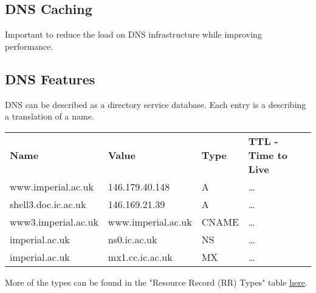 \documentclass{report}
\begin{document}
        \subsection*{DNS Caching}
            Important to reduce the load on DNS infrastructure while improving performance.
        \subsection*{DNS Features}
            DNS can be described as a directory service database. Each entry is a  describing a translation of a name.
            \begin{center}
                \begin{tabular}{l l l l}
                    \textbf{Name} & \textbf{Value} & \textbf{Type} & \textbf{TTL - Time to Live} \\
                    www.imperial.ac.uk & 146.179.40.148 & A & \dots \\
                    shell3.doc.ic.ac.uk & 146.169.21.39 & A & \dots \\
                    www3.imperial.ac.uk & www.imperial.ac.uk & CNAME & \dots \\
                    imperial.ac.uk & ns0.ic.ac.uk & NS & \dots \\
                    imperial.ac.uk & mx1.cc.ic.ac.uk & MX & \dots \\
                \end{tabular}
            \end{center}
            More of the types can be found in the "Resource Record (RR) Types" table \href{https://www.iana.org/assignments/dns-parameters/dns-parameters.xhtml}{here}.
\end{document}
